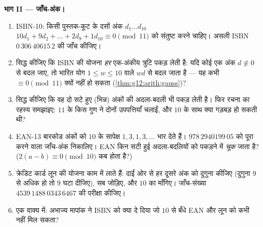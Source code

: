 \begin{problem}
\medskip
\noindent\textbf{भाग II --- जाँच-अंक।}
\begin{enumerate}[resume]
  \item ISBN{-}10: किसी पुस्तक-कूट के दसों अंक $d_1 \dots d_{10}$ $10d_1 + 9d_2 + \dots + 2d_9 + 1d_{10} \equiv 0
        \pmod{11}$ को संतुष्ट करने
        चाहिए। असली ISBN $0\,306\,40615\,2$ की जाँच कीजिए।
  \item सिद्ध कीजिए कि ISBN की योजना \emph{हर} एक-अंकीय त्रुटि पकड़ लेती है:
        यदि कोई एक अंक $d \not\equiv 0$ से बदल जाए, तो भारित योग $1 \leq w \leq 10$ वाले $w d$ से
        बदल जाता है --- यह कभी $\equiv 0 \pmod{11}$ क्यों नहीं हो सकता (\cref{thm:g12:arith:gauss})?
  \item सिद्ध कीजिए कि वह दो सटे हुए (भिन्न) अंकों की अदला-बदली भी पकड़ लेती
        है। फिर रचना का रहस्य समझाइए: $11$ के किस गुण ने दोनों उपपत्तियाँ
        चलाईं, और  $10$ के साथ क्या गड़बड़ हो सकती थी?
  \item EAN{-}13 बारकोड अंकों को $10$ के सापेक्ष $1, 3, 1, 3, \dots$ भार देते हैं। $978\,2940199\,05$
        को पूरा करने वाला जाँच-अंक निकालिए। EAN किन सटी हुई अदला-बदलियों को
        पकड़ने में \emph{चूक} जाता है? ($2(a - b) \equiv 0 \pmod{10}$ कब होता है?)
  \item क्रेडिट कार्ड लून की योजना काम में लाते हैं: दाईं ओर से हर दूसरे अंक
        को दुगुना कीजिए (दुगुना $9$ से अधिक हो तो $9$ घटा दीजिए), सब
        जोड़िए, और $10$ का  माँगिए। जाँच-संख्या $4539\,1488\,0343\,6467$ की परीक्षा
        कीजिए।
  \item एक वाक्य में: अभाज्य मापांक ने ISBN को क्या दे दिया जो $10$ से बँधे
        EAN और लून को कभी नहीं मिल सकता?
\end{enumerate}


\end{problem}
